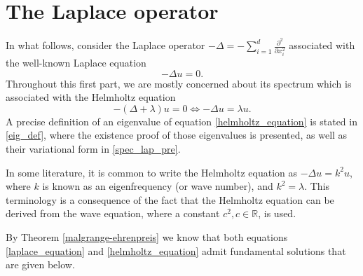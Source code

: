 \section{The Laplace operator}
\label{section:laplace_op}

In what follows, consider the Laplace operator \(-\Delta = -\sum_{i=1}^{d} \frac{\partial^2}{\partial x_i^2}\) associated with the well-known Laplace equation
\begin{equation} \label{laplace_equation}
    -\Delta u = 0.
\end{equation}
Throughout this first part, we are mostly concerned about its spectrum which is associated with the Helmholtz equation
\begin{equation} \label{helmholtz_equation}
    -(\Delta+\lambda) u = 0 \iff -\Delta u = \lambda u.
\end{equation}
A precise definition of an eigenvalue of equation \eqref{helmholtz_equation} is stated in \ref{eig_def}, where the existence proof of those eigenvalues is presented, as well as their variational form in \ref{spec_lap_pre}.
\begin{remark}
    In some literature, it is common to write the Helmholtz equation as \(-\Delta u = k^2 u\), where \(k\) is known as an eigenfrequency (or wave number), and \(k^2 = \lambda\). This terminology is a consequence of the fact that the Helmholtz equation can be derived from the wave equation, where a constant \(c^2, c \in \mathbb{R}\), is used.
\end{remark}

By Theorem \ref{malgrange-ehrenpreis} we know that both equations \eqref{laplace_equation} and \eqref{helmholtz_equation} admit fundamental solutions that are given below.

